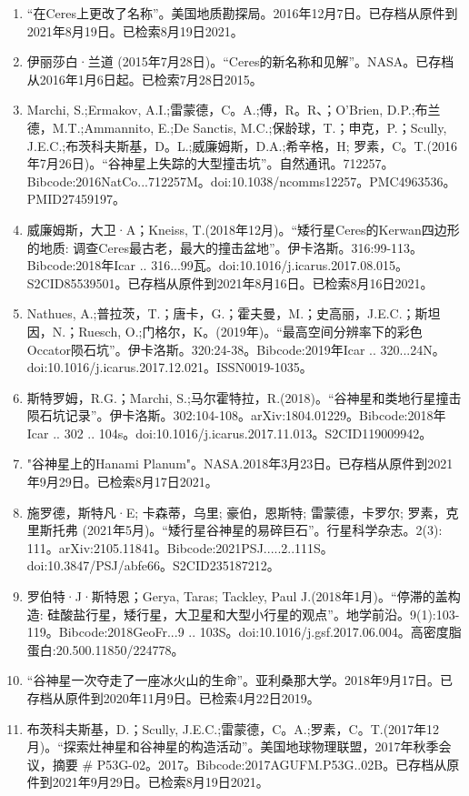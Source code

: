 \begin{enumerate}
\item “在Ceres上更改了名称”。美国地质勘探局。2016年12月7日。已存档从原件到2021年8月19日。已检索8月19日2021。
\item 伊丽莎白·兰道 (2015年7月28日)。“Ceres的新名称和见解”。NASA。已存档从2016年1月6日起。已检索7月28日2015。
\item Marchi, S.;Ermakov, A.I.;雷蒙德，C。A.;傅，R。R、；O'Brien, D.P.;布兰德，M.T.;Ammannito, E.;De Sanctis, M.C.;保龄球，T.；申克，P.；Scully, J.E.C.;布茨科夫斯基，D。L.;威廉姆斯，D.A.;希辛格，H; 罗素，C。T.(2016年7月26日)。“谷神星上失踪的大型撞击坑”。自然通讯。712257。Bibcode:2016NatCo...712257M。doi:10.1038/ncomms12257。PMC4963536。PMID27459197。  
\item 威廉姆斯，大卫·A；Kneiss, T.(2018年12月)。“矮行星Ceres的Kerwan四边形的地质: 调查Ceres最古老，最大的撞击盆地”。伊卡洛斯。316:99-113。Bibcode:2018年Icar .. 316...99瓦。doi:10.1016/j.icarus.2017.08.015。S2CID85539501。已存档从原件到2021年8月16日。已检索8月16日2021。 
\item Nathues, A.;普拉茨，T.；唐卡，G.；霍夫曼，M.；史高丽，J.E.C.；斯坦因，N.；Ruesch, O.;门格尔，K。(2019年)。“最高空间分辨率下的彩色Occator陨石坑”。伊卡洛斯。320:24-38。Bibcode:2019年Icar .. 320...24N。doi:10.1016/j.icarus.2017.12.021。ISSN0019-1035。 
\item 斯特罗姆，R.G.；Marchi, S.;马尔霍特拉，R.(2018)。“谷神星和类地行星撞击陨石坑记录”。伊卡洛斯。302:104-108。arXiv:1804.01229。Bibcode:2018年Icar .. 302 .. 104s。doi:10.1016/j.icarus.2017.11.013。S2CID119009942。 
\item "谷神星上的Hanami Planum"。NASA.2018年3月23日。已存档从原件到2021年9月29日。已检索8月17日2021。
\item 施罗德，斯特凡·E; 卡森蒂，乌里; 豪伯，恩斯特; 雷蒙德，卡罗尔; 罗素，克里斯托弗 (2021年5月)。“矮行星谷神星的易碎巨石”。行星科学杂志。2(3): 111。arXiv:2105.11841。Bibcode:2021PSJ.....2..111S。doi:10.3847/PSJ/abfe66。S2CID235187212。 
\item 罗伯特·J·斯特恩；Gerya, Taras; Tackley, Paul J.(2018年1月)。“停滞的盖构造: 硅酸盐行星，矮行星，大卫星和大型小行星的观点”。地学前沿。9(1):103-119。Bibcode:2018GeoFr...9 .. 103S。doi:10.1016/j.gsf.2017.06.004。高密度脂蛋白:20.500.11850/224778。
\item “谷神星一次夺走了一座冰火山的生命”。亚利桑那大学。2018年9月17日。已存档从原件到2020年11月9日。已检索4月22日2019。
\item 布茨科夫斯基，D.；Scully, J.E.C.;雷蒙德，C。A.;罗素，C。T.(2017年12月)。“探索灶神星和谷神星的构造活动”。美国地球物理联盟，2017年秋季会议，摘要 # P53G-02。2017。Bibcode:2017AGUFM.P53G..02B。已存档从原件到2021年9月29日。已检索8月19日2021。

\end{enumerate}
